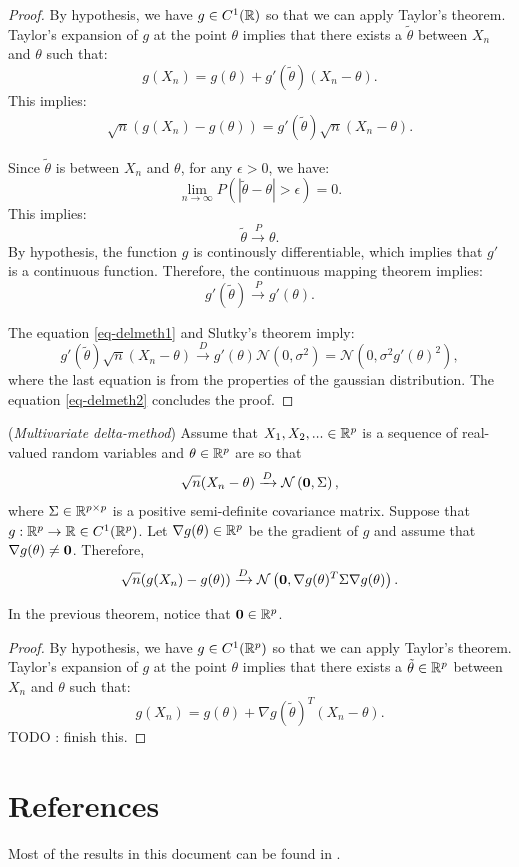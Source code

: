 \documentclass{article}
\begin{document}
\begin{proof}
By hypothesis, we have $g\in C^1(\mathbb{R})$ so that we can apply Taylor's theorem. 
Taylor's expansion of $g$ at the point $\theta$ implies that there exists a $\tilde{\theta}$ between 
$X_n$ and $\theta$ such that:
$$
g(X_n) = g(\theta) + g'\left(\tilde{\theta}\right)(X_n-\theta).
$$
This implies:
\begin{align}
\label{eq-delmeth2}
\sqrt{n} (g(X_n) - g(\theta)) = g'\left(\tilde{\theta}\right) \sqrt{n} (X_n-\theta).
\end{align}

Since $\tilde{\theta}$ is between $X_n$ and $\theta$, for any $\epsilon>0$, we have:
$$
\lim_{n\rightarrow \infty} P(|\tilde{\theta} - \theta|>\epsilon)=0.
$$
This implies:
$$
\tilde{\theta} \xrightarrow{P} \theta.
$$
By hypothesis, the function $g$ is continously differentiable, which implies that $g'$ is a 
continuous function. 
Therefore, the continuous mapping theorem implies:
$$
g'\left(\tilde{\theta}\right) \xrightarrow{P} g'(\theta).
$$

The equation \ref{eq-delmeth1} and Slutky's theorem imply:
$$
g'\left(\tilde{\theta}\right) \sqrt{n} (X_n-\theta) 
\xrightarrow{D} g'(\theta) \mathcal{N}(0,\sigma^2) = \mathcal{N}(0,\sigma^2 g'(\theta)^2),
$$
where the last equation is from the properties of the gaussian 
distribution. 
The equation \ref{eq-delmeth2} concludes the proof.
\end{proof}


\begin{theorem}
(\emph{Multivariate delta-method})
Assume that $X_1,X_2,... \in\mathbb{R}^p$ is a sequence of real-valued random variables 
and $\theta\in\mathbb{R}^p$ are so that 
\begin{align}
\label{eq-delmeth3}
\sqrt{n} (X_n - \theta) \xrightarrow{D} \mathcal{N}\left({\bf 0},\Sigma\right),
\end{align}
where $\Sigma\in\mathbb{R}^{p\times p}$ is a positive semi-definite covariance matrix. 
Suppose that $g:\mathbb{R}^p \rightarrow \mathbb{R} \in C^1(\mathbb{R}^p)$. 
Let $\nabla g(\theta)\in\mathbb{R}^p$ be the gradient of $g$ and assume that $\nabla g(\theta)\neq {\bf 0}$. 
Therefore, 
$$
\sqrt{n} (g(X_n) - g(\theta)) \xrightarrow{D} \mathcal{N}\left({\bf 0}, \nabla g(\theta)^T \Sigma \nabla g(\theta)\right).
$$
\end{theorem}

In the previous theorem, notice that ${\bf 0}\in\mathbb{R}^p$. 

\begin{proof}
By hypothesis, we have $g\in C^1(\mathbb{R}^p)$ so that we can apply Taylor's theorem. 
Taylor's expansion of $g$ at the point $\theta$ implies that there exists a $\tilde{\theta}\in \mathbb{R}^p$ between 
$X_n$ and $\theta$ such that:
$$
g(X_n) = g(\theta) + \nabla g\left(\tilde{\theta}\right)^T (X_n-\theta).
$$
TODO : finish this.
\end{proof}


\section{References}

Most of the results in this document can be found in \cite{Vaart2000}.





\end{document}
